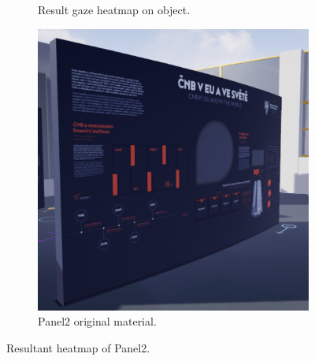 \begin{figure}[!ht]
\begin{subfigure}[b]{0.32\textwidth}
        \caption{Result gaze heatmap on object.}
    \end{subfigure}
    \hfill
    \begin{subfigure}[b]{0.305\textwidth}
        \centering
        \includegraphics[width=\textwidth]{img/data/Panel2/resultant/original.png}
        \caption{Panel2 original material.}
    \end{subfigure}
    \caption{Resultant heatmap of Panel2.}
    \label{fig:Panel2-resultant-heatmaps.}
\end{figure}